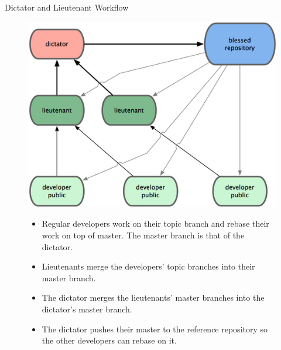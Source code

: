 \documentclass{beamer}
\begin{document}
\begin{frame}{Dictator and Lieutenant Workflow}
\begin{figure} 
\centering
\includegraphics[scale=0.6]{images/dictator-and-lieteutnant-workflow.png}
\begin{itemize}
\pause \item Regular developers work on their topic branch and rebase their work on top of master. The master branch is that of the dictator.
\pause \item Lieutenants merge the developers’ topic branches into their master branch.
\pause \item The dictator merges the lieutenants’ master branches into the dictator’s master branch.
\pause \item The dictator pushes their master to the reference repository so the other developers can rebase on it.
\end{itemize}
\end{figure}
\end{frame}
\end{document}
